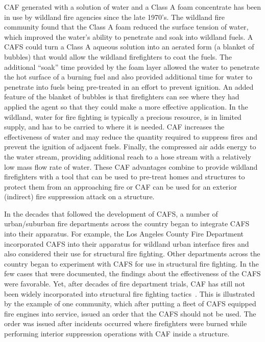 \documentclass[12pt,oneside]{book}
\begin{document}
CAF generated with a solution of water and a Class A foam concentrate has been in use by wildland fire agencies since the late 1970's. The wildland fire community found that the Class A foam reduced the surface tension of water, which improved the water's ability to penetrate and soak into wildland fuels. A CAFS could turn a Class A aqueous solution into an aerated form (a blanket of bubbles) that would allow the wildland firefighters to coat the fuels. The additional ``soak'' time provided by the foam layer allowed the water to penetrate the hot surface of a burning fuel and also provided additional time for water to penetrate into fuels being pre-treated in an effort to prevent ignition. An added feature of the blanket of bubbles is that firefighters can see where they had applied the agent so that they could make a more effective application. In the wildland, water for fire fighting is typically a precious resource, is in limited supply, and has to be carried to where it is needed. CAF increases the effectiveness of water and may reduce the quantity required to suppress fires and prevent the ignition of adjacent fuels. Finally, the compressed air adds energy to the water stream, providing additional reach to a hose stream with a relatively low mass flow rate of water. These CAF advantages combine to provide wildland firefighters with a tool that can be used to pre-treat homes and structures to protect them from an approaching fire or CAF can be used for an exterior (indirect) fire suppression attack on a structure.

In the decades that followed the development of CAFS, a number of urban/suburban fire departments across the country began to integrate CAFS into their apparatus. For example, the Los Angeles County Fire Department incorporated CAFS into their apparatus for wildland urban interface fires and also considered their use for structural fire fighting. Other departments across the country began to experiment with CAFS for use in structural fire fighting. In the few cases that were documented, the findings about the effectiveness of the CAFS were favorable. Yet, after decades of fire department trials, CAF has still not been widely incorporated into structural fire fighting tactics~\cite{USFA:CAFS,Lorh:2002}. This is illustrated by the example of one community, which after putting a fleet of CAFS equipped fire engines into service, issued an order that the CAFS should not be used. The order was issued after incidents occurred where firefighters were burned while performing interior suppression operations with CAF inside a structure.
\end{document}
